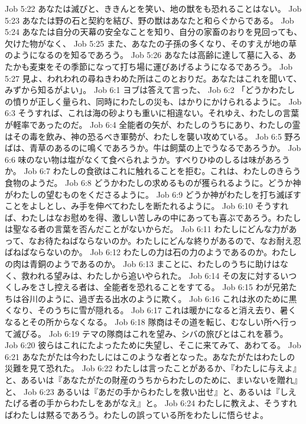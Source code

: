 Job 5:22  あなたは滅びと、ききんとを笑い、地の獣をも恐れることはない。
Job 5:23  あなたは野の石と契約を結び、野の獣はあなたと和らぐからである。
Job 5:24  あなたは自分の天幕の安全なことを知り、自分の家畜のおりを見回っても、欠けた物がなく、
Job 5:25  また、あなたの子孫の多くなり、そのすえが地の草のようになるのを知るであろう。
Job 5:26  あなたは高齢に達して墓に入る、あたかも麦束をその季節になって打ち場に運びあげるようになるであろう。
Job 5:27  見よ、われわれの尋ねきわめた所はこのとおりだ。あなたはこれを聞いて、みずから知るがよい」。
Job 6:1  ヨブは答えて言った、
Job 6:2  「どうかわたしの憤りが正しく量られ、同時にわたしの災も、はかりにかけられるように。
Job 6:3  そうすれば、これは海の砂よりも重いに相違ない。それゆえ、わたしの言葉が軽率であったのだ。
Job 6:4  全能者の矢が、わたしのうちにあり、わたしの霊はその毒を飲み、神の恐るべき軍勢が、わたしを襲い攻めている。
Job 6:5  野ろばは、青草のあるのに鳴くであろうか。牛は飼葉の上でうなるであろうか。
Job 6:6  味のない物は塩がなくて食べられようか。すべりひゆのしるは味があろうか。
Job 6:7  わたしの食欲はこれに触れることを拒む。これは、わたしのきらう食物のようだ。
Job 6:8  どうかわたしの求めるものが獲られるように。どうか神がわたしの望むものをくださるように。
Job 6:9  どうか神がわたしを打ち滅ぼすことをよしとし、み手を伸べてわたしを断たれるように。
Job 6:10  そうすれば、わたしはなお慰めを得、激しい苦しみの中にあっても喜ぶであろう。わたしは聖なる者の言葉を否んだことがないからだ。
Job 6:11  わたしにどんな力があって、なお待たねばならないのか。わたしにどんな終りがあるので、なお耐え忍ばねばならないのか。
Job 6:12  わたしの力は石の力のようであるのか。わたしの肉は青銅のようであるのか。
Job 6:13  まことに、わたしのうちに助けはなく、救われる望みは、わたしから追いやられた。
Job 6:14  その友に対するいつくしみをさし控える者は、全能者を恐れることをすてる。
Job 6:15  わが兄弟たちは谷川のように、過ぎ去る出水のように欺く。
Job 6:16  これは氷のために黒くなり、そのうちに雪が隠れる。
Job 6:17  これは暖かになると消え去り、暑くなるとその所からなくなる。
Job 6:18  隊商はその道を転じ、むなしい所へ行って滅びる。
Job 6:19  テマの隊商はこれを望み、シバの旅びとはこれを慕う。
Job 6:20  彼らはこれにたよったために失望し、そこに来てみて、あわてる。
Job 6:21  あなたがたは今わたしにはこのような者となった。あなたがたはわたしの災難を見て恐れた。
Job 6:22  わたしは言ったことがあるか、『わたしに与えよ』と、あるいは『あなたがたの財産のうちからわたしのために、まいないを贈れ』と、
Job 6:23  あるいは『あだの手からわたしを救い出せ』と、あるいは『しえたげる者の手からわたしをあがなえ』と。
Job 6:24  わたしに教えよ、そうすればわたしは黙るであろう。わたしの誤っている所をわたしに悟らせよ。
